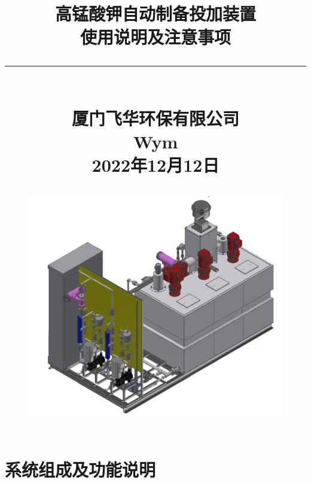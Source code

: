 \documentclass[UTF8,a4paper,12pt,titlepage]{ctexart}
\begin{document}
\title{
    高锰酸钾自动制备投加装置\\[2.5mm]
    使用说明及注意事项\\
   {\noindent}\rule{16cm}{1pt}\\[3mm]
    厦门飞华环保有限公司\\
    Wym\\
    2022年12月12日
   \begin{figure}[h]
      \centering
      \includegraphics[height=10cm]{g0.PNG}
   \end{figure}
}
\date{}

\maketitle %

\tableofcontents %

\newpage %

\section{系统组成及功能说明}
\end{document}
